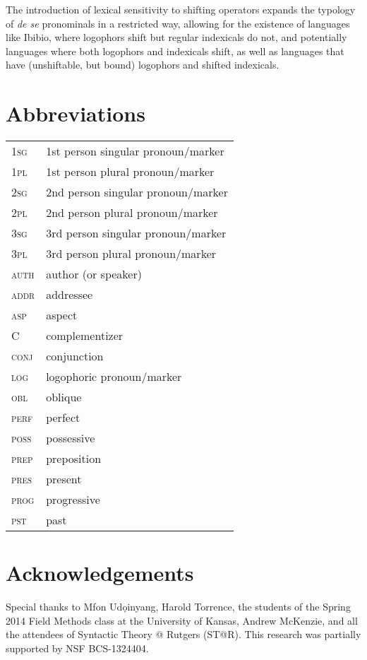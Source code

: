 \documentclass[output=paper]{langscibook}
\begin{document}
The introduction of lexical sensitivity to shifting operators expands the typology of \textit{de se} pronominals in a restricted way, allowing for the existence of languages like Ibibio, where logophors shift but regular indexicals do not, and potentially languages where both logophors and indexicals shift, as well as languages that have (unshiftable, but bound) logophors and shifted indexicals.


\section*{Abbreviations} 
\noindent\begin{tabularx}{.8\textwidth}{@{}>{\scshape}lQ@{}}
\textsc{1sg} & 1st person singular pronoun/marker\\
\textsc{1pl} & 1st person plural pronoun/marker\\
\textsc{2sg} & 2nd person singular pronoun/marker\\
\textsc{2pl} & 2nd person plural pronoun/marker\\
\textsc{3sg} & 3rd person singular pronoun/marker\\
\textsc{3pl} & 3rd person plural pronoun/marker\\
\textsc{auth} & author (or speaker)\\
\textsc{addr} & addressee\\
\textsc{asp} & aspect\\
C & complementizer\\
\textsc{conj} & conjunction\\
\textsc{log} & logophoric pronoun/marker\\
\textsc{obl} & oblique\\
\textsc{perf} & perfect\\
\textsc{poss} & possessive\\
\textsc{prep} & preposition\\
\textsc{pres} & present\\
\textsc{prog} & progressive\\
\textsc{pst} & past\\
\end{tabularx}

\section*{Acknowledgements}
Special thanks to Mfon Ud\d{o}inyang, Harold Torrence, the students of the Spring 2014 Field Methods class at the University of Kansas, Andrew McKenzie, and all the attendees of Syntactic Theory @ Rutgers (ST@R). This research was partially supported by NSF BCS-1324404.



{\sloppy \printbibliography[heading=subbibliography,notkeyword=this]}
\end{document}
